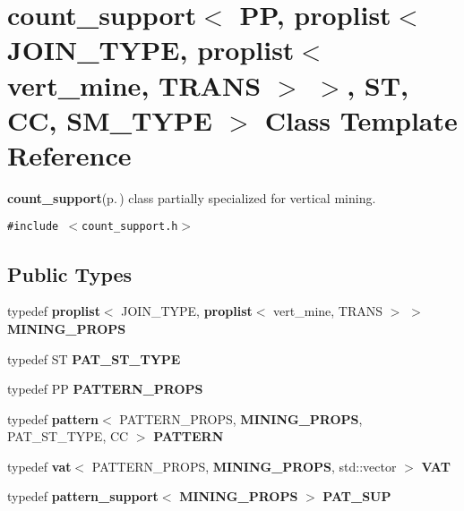 \section{count\_\-support$<$ PP, proplist$<$ JOIN\_\-TYPE, proplist$<$ vert\_\-mine, TRANS $>$ $>$, ST, CC, SM\_\-TYPE $>$ Class Template Reference}
\label{classcount__support_3_01PP_00_01proplist_3_01JOIN__TYPE_00_01proplist_3_01vert__mine_00_01TRANS_01_4_01_4_00_01ST_00_01CC_00_01SM__TYPE_01_4}
{\bf count\_\-support}{\rm (p.\,\pageref{classcount__support})} class partially specialized for vertical mining.  


{\tt \#include $<$count\_\-support.h$>$}

\subsection*{Public Types}
\begin{CompactItemize}
\item 
typedef {\bf proplist}$<$ JOIN\_\-TYPE, {\bf proplist}$<$ vert\_\-mine, TRANS $>$ $>$ {\bf MINING\_\-PROPS}\label{classcount__support_3_01PP_00_01proplist_3_01JOIN__TYPE_00_01proplist_3_01vert__mine_00_01TRANS_01_4_01_4_00_01ST_00_01CC_00_01SM__TYPE_01_4_w0}

\item 
typedef ST {\bf PAT\_\-ST\_\-TYPE}\label{classcount__support_3_01PP_00_01proplist_3_01JOIN__TYPE_00_01proplist_3_01vert__mine_00_01TRANS_01_4_01_4_00_01ST_00_01CC_00_01SM__TYPE_01_4_w1}

\item 
typedef PP {\bf PATTERN\_\-PROPS}\label{classcount__support_3_01PP_00_01proplist_3_01JOIN__TYPE_00_01proplist_3_01vert__mine_00_01TRANS_01_4_01_4_00_01ST_00_01CC_00_01SM__TYPE_01_4_w2}

\item 
typedef {\bf pattern}$<$ PATTERN\_\-PROPS, {\bf MINING\_\-PROPS}, PAT\_\-ST\_\-TYPE, CC $>$ {\bf PATTERN}\label{classcount__support_3_01PP_00_01proplist_3_01JOIN__TYPE_00_01proplist_3_01vert__mine_00_01TRANS_01_4_01_4_00_01ST_00_01CC_00_01SM__TYPE_01_4_w3}

\item 
typedef {\bf vat}$<$ PATTERN\_\-PROPS, {\bf MINING\_\-PROPS}, std::vector $>$ {\bf VAT}\label{classcount__support_3_01PP_00_01proplist_3_01JOIN__TYPE_00_01proplist_3_01vert__mine_00_01TRANS_01_4_01_4_00_01ST_00_01CC_00_01SM__TYPE_01_4_w4}

\item 
typedef {\bf pattern\_\-support}$<$ {\bf MINING\_\-PROPS} $>$ {\bf PAT\_\-SUP}\label{classcount__support_3_01PP_00_01proplist_3_01JOIN__TYPE_00_01proplist_3_01vert__mine_00_01TRANS_01_4_01_4_00_01ST_00_01CC_00_01SM__TYPE_01_4_w5}

\end{CompactItemize}
